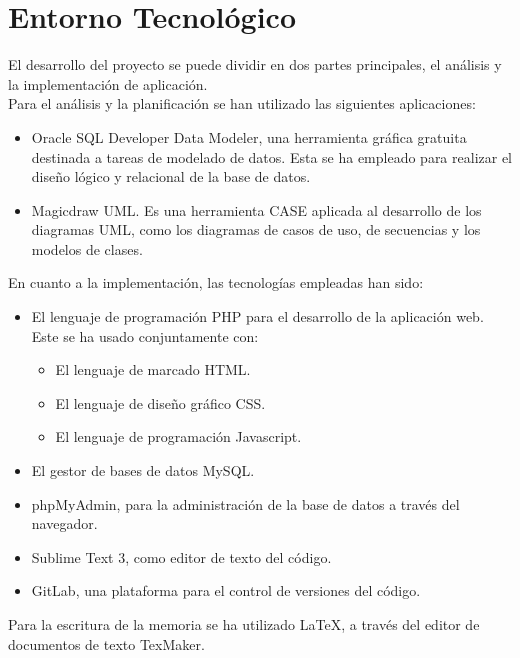 \chapter{Entorno Tecnol\'ogico}

El desarrollo del proyecto se puede dividir en dos partes principales, el análisis y la implementación de aplicación. \\

Para el análisis y la planificación se han utilizado las siguientes aplicaciones:
\begin{itemize}
	\item Oracle SQL Developer Data Modeler, una herramienta gráfica gratuita destinada a tareas de modelado de datos. Esta se ha empleado para realizar el diseño lógico y relacional de la base de datos.
	\item Magicdraw UML. Es una herramienta CASE aplicada al desarrollo de los diagramas UML, como los diagramas de casos de uso, de secuencias y los modelos de clases.
\end{itemize}

En cuanto a la implementación, las tecnologías empleadas han sido:
\begin{itemize}
	\item El lenguaje de programación PHP para el desarrollo de la aplicación web. Este se ha usado conjuntamente con:
		\begin{itemize}
			\item El lenguaje de marcado HTML.
			\item El lenguaje de diseño gráfico CSS.
			\item El lenguaje de programación Javascript.
		\end{itemize}
	\item El gestor de bases de datos MySQL.
	\item phpMyAdmin, para la administración de la base de datos a través del navegador.
	\item Sublime Text 3, como editor de texto del código.
	\item GitLab, una plataforma para el control de versiones del código.
\end{itemize}

Para la escritura de la memoria se ha utilizado LaTeX, a través del editor de documentos de texto TexMaker.
